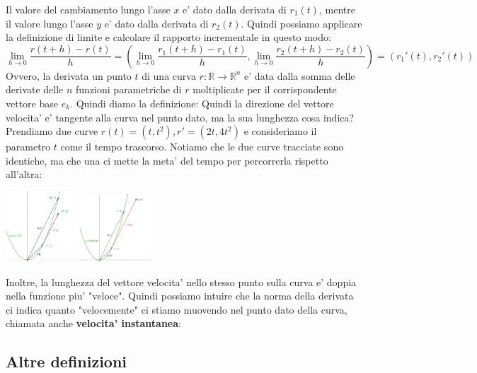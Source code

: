 \documentclass{report}
\begin{document}
Il valore del cambiamento lungo l'asse $ x $ e' dato dalla derivata di $ r_1(t) $, mentre il valore lungo l'asse $ y $ e' dato dalla derivata di $ r_2(t) $. Quindi possiamo applicare la definizione di limite e calcolare il rapporto incrementale in questo modo:
\[
  \lim_{h \to 0}\frac{r(t+h)-r(t)}{h} = \left(\lim_{h\to 0}\frac{r_1(t+h)-r_1(t)}{h}, \lim_{h \to 0}\frac{r_2(t+h)-r_2(t)}{h}\right) = (r_1'(t), r_2'(t))
\]
Ovvero, la derivata un punto $ t $ di una curva $ r:\mathbb{R}\to\mathbb{R}^n $ e' data dalla somma delle derivate delle $ n $ funzioni parametriche di $ r $ moltiplicate per il corrispondente vettore base $ e_k $. Quindi diamo la definizione:
Quindi la direzione del vettore velocita' e' tangente alla curva nel punto dato, ma la sua lunghezza cosa indica?\\
Prendiamo due curve $ r(t) = (t, t^2),r' = (2t, 4t^2) $ e consideriamo il parametro $ t $ come il tempo trascorso. Notiamo che le due curve tracciate sono identiche, ma che una ci mette la meta' del tempo per percorrerla rispetto all'altra:
\begin{center}
  \includegraphics[width=0.2\textwidth]{img/2024-05-05-17-05-56.png}
  \includegraphics[width=0.2\textwidth]{img/2024-05-05-17-02-33.png}
\end{center}
Inoltre, la lunghezza del vettore velocita' nello stesso punto sulla curva e' doppia nella funzione piu' "veloce". Quindi possiamo intuire che la norma della derivata ci indica quanto "velocemente" ci stiamo muovendo nel punto dato della curva, chiamata anche \textbf{velocita' instantanea}:
\subsection{Altre definizioni}
\end{document}
